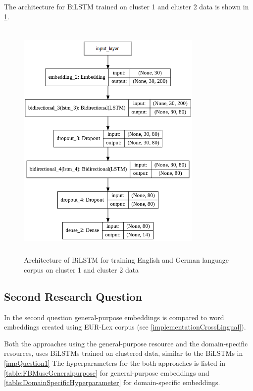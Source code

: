 The architecture for \gls{BiLSTM} trained on cluster 1 and cluster 2 data is shown in \ref{fig:cluster1&2LSTM}.

\begin{figure}[!ht]
    \centering
    \includegraphics[width=9cm, height=12cm]{pics/LSTM_LEGALEMB_CLUSTER_1.png}
    \captionsetup{justification=centering,margin=1cm}
    \caption{Architecture of \gls{BiLSTM} for training English and German language corpus on cluster 1 and cluster 2 data}
    \label{fig:cluster1&2LSTM}
\end{figure}


\clearpage

\subsection{Second Research Question}
In the second question general-purpose embeddings is compared to word embeddings created using EUR-Lex corpus (see \ref{implementationCrossLingual}).

Both the approaches using the general-purpose resource and the domain-specific resources, uses \glspl{BiLSTM} trained on clustered data, similar to the \glspl{BiLSTM} in \ref{impQuestion1}
The hyperparameters for the both approaches is listed in \ref{table:FBMuseGeneralpurpose} for general-purpose embeddings and \ref{table:DomainSpecificHyperparameter} for domain-specific embeddings.

